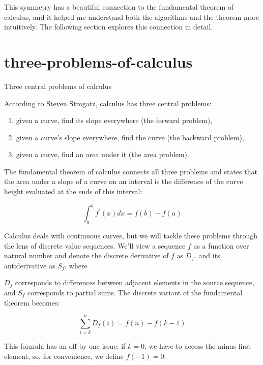 \documentclass{article}
\begin{document}
This symmetry has a beautiful connection to the fundamental theorem of calculus,
and it helped me understand both the algorithms and the theorem more intuitively.
The following section explores this connection in detail.

\section{three-problems-of-calculus}{Three central problems of calculus}

According to Steven Strogatz, calculus has three central problems:
\begin{enumerate}
\item given a curve, find its slope everywhere (the forward problem),
\item given a curve’s slope everywhere, find the curve (the backward problem),
\item given a curve, find an area under it (the area problem).
\end{enumerate}

The fundamental theorem of calculus connects all three problems
and states that the area under a slope of a curve on an interval
is the difference of the curve height evaluated at the ends of this interval:

\[\int_a^b f^{\prime}(x) dx = f(b) - f(a)\]

Calculus deals with continuous curves, but we will tackle these problems through the lens of discrete value sequences.
We'll view a sequence $f$ as a function over natural number
and denote the discrete derivative of $f$ as $D_f$.
and its antiderivative as $S_f$, where


$D_f$ corresponds to differences between adjacent elements in the source sequence,
and $S_f$ corresponds to partial sums.
The discrete variant of the fundamental theorem becomes:

\[ \sum_{i=k}^n D_f(i) = f(n) - f(k-1) \]

\label{off-by-one}
This formula has an off-by-one issue:
if $k = 0$,
we have to access the minus first element, so, for convenience,
we define $f(-1) = 0$.
\end{document}
